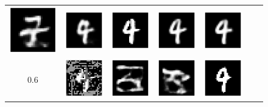 \begin{figure}[h]
\begin{tabular}{cccc|ccc}
        \includegraphics[width=0.1\linewidth]{pics/3_adv_att/mnist_MCMC/mnist_noMCMC_adv_rec_3_rad_0.1.pdf} &
        \includegraphics[width=0.1\linewidth]{pics/3_adv_att/mnist_MCMC/mnist_noMCMC_adv_rec_t_3_rad_0.1.pdf} &
        \includegraphics[width=0.1\linewidth]{pics/3_adv_att/mnist_MCMC/mnist_MCMC_adv_3_rad_0.1.pdf} &
        \includegraphics[width=0.1\linewidth]{pics/3_adv_att/mnist_MCMC/mnist_MCMC_adv_rec_3_rad_0.1.pdf} &
        \includegraphics[width=0.1\linewidth]{pics/3_adv_att/mnist_MCMC/mnist_MCMC_adv_rec_t_3_rad_0.1.pdf}\\ 
        0.6 & \includegraphics[width=0.1\linewidth]{pics/3_adv_att/mnist_MCMC/mnist_noMCMC_adv_3_rad_0.6.pdf} &
        \includegraphics[width=0.1\linewidth]{pics/3_adv_att/mnist_MCMC/mnist_noMCMC_adv_rec_3_rad_0.6.pdf} &
        \includegraphics[width=0.1\linewidth]{pics/3_adv_att/mnist_MCMC/mnist_noMCMC_adv_rec_t_3_rad_0.6.pdf} &
        \includegraphics[width=0.1\linewidth]{pics/3_adv_att/mnist_MCMC/mnist_MCMC_adv_3_rad_0.6.pdf} &

\end{tabular}
\end{figure}
